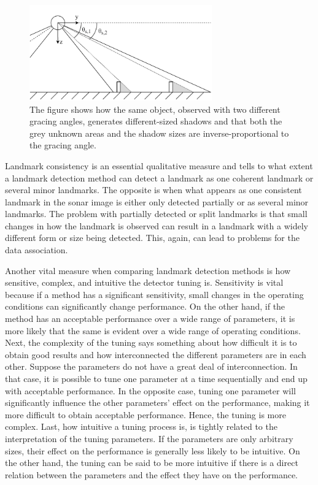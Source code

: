 \begin{figure}
    \centering
    \includegraphics[width=0.7\textwidth]{figures/object_shadow.drawio.pdf}
    \caption{The figure shows how the same object, observed with two different gracing angles, generates different-sized shadows and that both the grey unknown areas and the shadow sizes are inverse-proportional to the gracing angle.}
    \label{fig:object_shadow}
\end{figure}

Landmark consistency is an essential qualitative measure and tells to what extent a landmark detection method can detect a landmark as one coherent landmark or several minor landmarks. The opposite is when what appears as one consistent landmark in the sonar image is either only detected partially or as several minor landmarks. The problem with partially detected or split landmarks is that small changes in how the landmark is observed can result in a landmark with a widely different form or size being detected. This, again, can lead to problems for the data association. 

Another vital measure when comparing landmark detection methods is how sensitive, complex, and intuitive the detector tuning is. Sensitivity is vital because if a method has a significant sensitivity, small changes in the operating conditions can significantly change performance. On the other hand, if the method has an acceptable performance over a wide range of parameters, it is more likely that the same is evident over a wide range of operating conditions. Next, the complexity of the tuning says something about how difficult it is to obtain good results and how interconnected the different parameters are in each other. Suppose the parameters do not have a great deal of interconnection. In that case, it is possible to tune one parameter at a time sequentially and end up with acceptable performance. In the opposite case, tuning one parameter will significantly influence the other parameters' effect on the performance, making it more difficult to obtain acceptable performance. Hence, the tuning is more complex. Last, how intuitive a tuning process is, is tightly related to the interpretation of the tuning parameters. If the parameters are only arbitrary sizes, their effect on the performance is generally less likely to be intuitive. On the other hand, the tuning can be said to be more intuitive if there is a direct relation between the parameters and the effect they have on the performance.     
